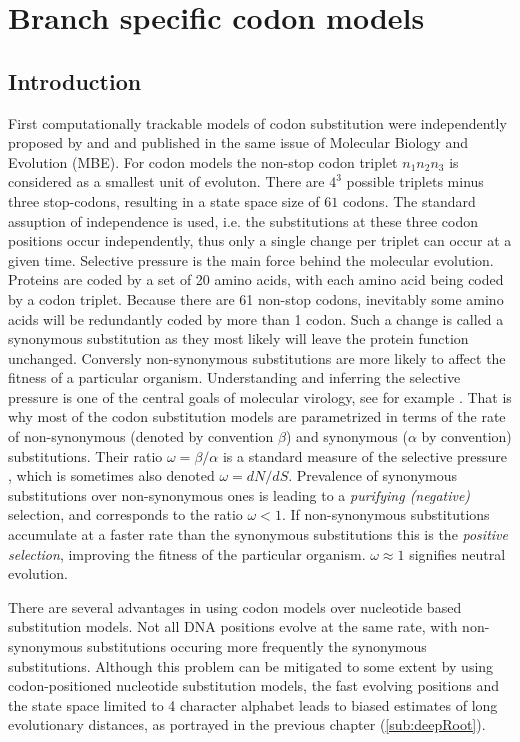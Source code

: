 \chapter{Branch specific codon models}

\section{Introduction}

First computationally trackable models of codon substitution were independently proposed by \cite{Muse1994} and \cite{Goldman1994} and published in the same issue of Molecular Biology and Evolution (MBE).
For codon models the non-stop codon triplet $n_{1}n_{2}n_{3}$ is considered as a smallest unit of evoluton.
There are $4^3$ possible triplets minus three stop-codons, resulting in a state space size of $61$ codons.
The standard assuption of independence is used, i.e. the substitutions at these three codon positions occur independently, thus only a single change per triplet can occur at a given time.
Selective pressure is the main force behind the molecular evolution.
Proteins are coded by a set of 20 amino acids, with each amino acid being coded by a codon triplet. 
Because there are 61 non-stop codons, inevitably some amino acids will be redundantly coded by more than 1 codon.
Such a change is called a synonymous substitution as they most likely will leave the protein function unchanged.
Conversly non-synonymous substitutions are more likely to affect the fitness of a particular organism.
Understanding and inferring the selective pressure is one of the central goals of molecular virology, see for example \citet{Bielejec2014a}.
That is why most of the codon substitution models are parametrized in terms of the rate of non-synonymous (denoted by convention $\beta$) and synonymous ($\alpha$ by convention) substitutions.
Their ratio $\omega=\beta / \alpha$ is a standard measure of the selective pressure \citep{ThePhylogeneticHandbook}, which is sometimes also denoted $\omega = dN/dS$.
Prevalence of synonymous substitutions over non-synonymous ones is leading to a \emph{purifying (negative)} selection, and corresponds to the ratio $\omega <1$.
If non-synonymous substitutions accumulate at a faster rate than the synonymous substitutions this is the \emph{positive selection}, improving the fitness of the particular organism.
$\omega\approx1$ signifies neutral evolution.

There are several advantages in using codon models over nucleotide based substitution models.
Not all DNA positions evolve at the same rate, with non-synonymous substitutions occuring more frequently the synonymous substitutions.
Although this problem can be mitigated to some extent by using codon-positioned nucleotide substitution models, the fast evolving positions and the state space limited to 4 character alphabet leads to biased estimates of long evolutionary distances, as portrayed in the previous chapter (\ref{sub:deepRoot}).

